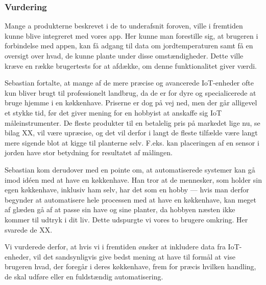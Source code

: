 \subsubsection*{Vurdering}
Mange a produkterne beskrevet i de to underafsnit foroven, ville i fremtiden kunne blive integreret med vores app. Her kunne man forestille sig, at brugeren i forbindelse med appen, kan få adgang til data om jordtemperaturen samt få en oversigt over hvad, de kunne plante under disse omstændigheder. Dette ville kræve en række brugertests for at afdække, om denne funktionalitet giver værdi.

Sebastian fortalte, at mange af de mere præcise og avancerede IoT-enheder ofte kun bliver brugt til professionelt landbrug, da de er for dyre og specialicerede at bruge hjemme i en køkkenhave. Priserne er dog på vej ned, men der går alligevel et stykke tid, før det giver mening for en hobbyist at anskaffe sig IoT måleinstrumenter. De fleste produkter til en betalelig pris på markedet lige nu, se bilag XX, vil være upræcise, og det vil derfor i langt de fleste tilfælde være langt mere sigende blot at kigge til planterne selv. F.eks. kan placeringen af en sensor i jorden have stor betydning for resultatet af målingen.

Sebastian kom derudover med en pointe om, at automatiserede systemer kan gå imod idéen med at have en køkkenhave. Han tror at de mennesker, som holder sin egen køkkenhave, inklusiv ham selv, har det som en hobby --- hvis man derfor begynder at automatisere hele processen med at have en køkkenhave, kan meget af glæden gå af at passe sin have og sine planter, da hobbyen næsten ikke kommer til udtryk i dit liv. Dette udspurgte vi vores to brugere omkring. Her svarede de XX.

Vi vurderede derfor, at hvis vi i fremtiden ønsker at inkludere data fra IoT-enheder, vil det sandsynligvis give bedst mening at have til formål at vise brugeren hvad, der foregår i deres køkkenhave, frem for præcis hvilken handling, de skal udføre eller en fuldstændig automatisering.
